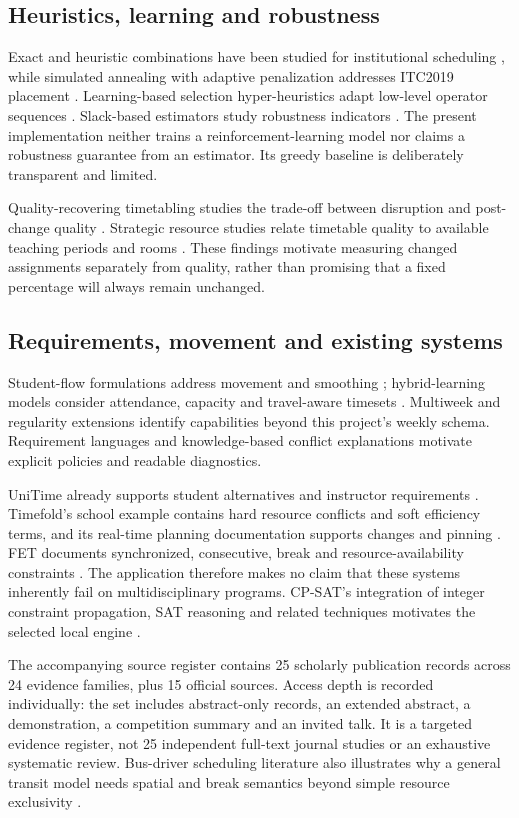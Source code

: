 \documentclass[pdflatex,sn-mathphys-num]{sn-jnl}
\theoremstyle{thmstyleone}
\theoremstyle{thmstyletwo}
\theoremstyle{thmstylethree}
\begin{document}
\subsection{Heuristics, learning and robustness}

Exact and heuristic combinations have been studied for institutional scheduling \cite{P08}, while simulated annealing with adaptive penalization addresses ITC2019 placement \cite{P16}. Learning-based selection hyper-heuristics adapt low-level operator sequences \cite{P13}. Slack-based estimators study robustness indicators \cite{P14}. The present implementation neither trains a reinforcement-learning model nor claims a robustness guarantee from an estimator. Its greedy baseline is deliberately transparent and limited.

Quality-recovering timetabling studies the trade-off between disruption and post-change quality \cite{P06}. Strategic resource studies relate timetable quality to available teaching periods and rooms \cite{P07}. These findings motivate measuring changed assignments separately from quality, rather than promising that a fixed percentage will always remain unchanged.

\subsection{Requirements, movement and existing systems}

Student-flow formulations address movement and smoothing \cite{P11}; hybrid-learning models consider attendance, capacity and travel-aware timesets \cite{P24}. Multiweek and regularity extensions \cite{P12} identify capabilities beyond this project's weekly schema. Requirement languages \cite{P17,P21} and knowledge-based conflict explanations \cite{P20} motivate explicit policies and readable diagnostics.

UniTime already supports student alternatives and instructor requirements \cite{P18,P19,D01}. Timefold's school example contains hard resource conflicts and soft efficiency terms, and its real-time planning documentation supports changes and pinning \cite{D02,D03}. FET documents synchronized, consecutive, break and resource-availability constraints \cite{D05}. The application therefore makes no claim that these systems inherently fail on multidisciplinary programs. CP-SAT's integration of integer constraint propagation, SAT reasoning and related techniques motivates the selected local engine \cite{P25}.

The accompanying source register contains 25 scholarly publication records across 24 evidence families, plus 15 official sources. Access depth is recorded individually: the set includes abstract-only records, an extended abstract, a demonstration, a competition summary and an invited talk. It is a targeted evidence register, not 25 independent full-text journal studies or an exhaustive systematic review. Bus-driver scheduling literature also illustrates why a general transit model needs spatial and break semantics beyond simple resource exclusivity \cite{P15}.
\end{document}
